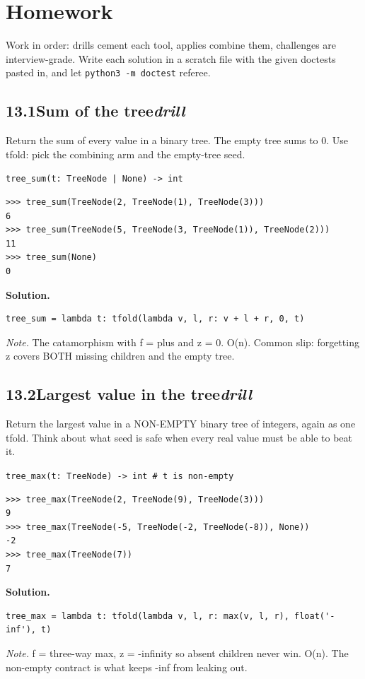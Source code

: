 \documentclass[10pt,letterpaper]{book}
\begin{document}
\section{Homework}
Work in order: drills cement each tool, applies combine them,
challenges are interview-grade. Write each solution in a scratch file with
the given doctests pasted in, and let \texttt{python3 -m doctest} referee.
\subsection*{13.1\quad Sum of the tree\hfill\textnormal{\textit{drill}}}
Return the sum of every value in a binary tree. The empty tree sums to 0. Use tfold: pick the combining arm and the empty-tree seed.

\noindent\texttt{tree\_sum(t: TreeNode | None) -> int}
\begin{lstlisting}[style=ex]
>>> tree_sum(TreeNode(2, TreeNode(1), TreeNode(3)))
6
>>> tree_sum(TreeNode(5, TreeNode(3, TreeNode(1)), TreeNode(2)))
11
>>> tree_sum(None)
0
\end{lstlisting}
\noindent\textbf{Solution.}
\begin{lstlisting}[style=code]
tree_sum = lambda t: tfold(lambda v, l, r: v + l + r, 0, t)
\end{lstlisting}
\noindent\textit{Note.} The catamorphism with f = plus and z = 0. O(n). Common slip: forgetting z covers BOTH missing children and the empty tree.

\subsection*{13.2\quad Largest value in the tree\hfill\textnormal{\textit{drill}}}
Return the largest value in a NON-EMPTY binary tree of integers, again as one tfold. Think about what seed is safe when every real value must be able to beat it.

\noindent\texttt{tree\_max(t: TreeNode) -> int   \# t is non-empty}
\begin{lstlisting}[style=ex]
>>> tree_max(TreeNode(2, TreeNode(9), TreeNode(3)))
9
>>> tree_max(TreeNode(-5, TreeNode(-2, TreeNode(-8)), None))
-2
>>> tree_max(TreeNode(7))
7
\end{lstlisting}
\noindent\textbf{Solution.}
\begin{lstlisting}[style=code]
tree_max = lambda t: tfold(lambda v, l, r: max(v, l, r), float('-inf'), t)
\end{lstlisting}
\noindent\textit{Note.} f = three-way max, z = -infinity so absent children never win. O(n). The non-empty contract is what keeps -inf from leaking out.
\end{document}
